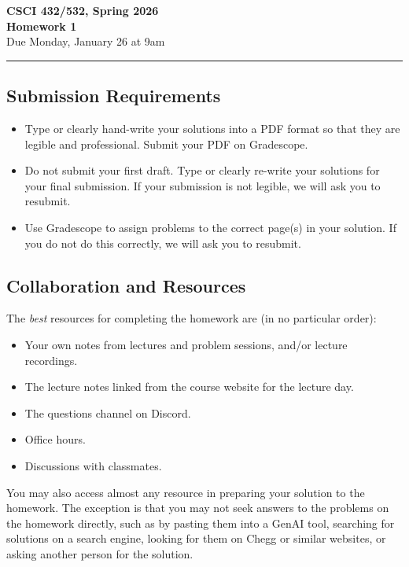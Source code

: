 \documentclass[11pt]{article}
\begin{document}
\begin{center}
\Large\textbf{CSCI 432/532, Spring 2026}%
\\
\LARGE\textbf{Homework 1}%
\\[0.5ex]
\large Due Monday, January 26 at 9am
\end{center}

\bigskip
\hrule
\bigskip

\subsection*{Submission Requirements}
\begin{itemize}
    \item Type or clearly hand-write your solutions into a PDF format so that they are legible and professional. Submit your PDF on Gradescope. 
    \item Do not submit your first draft. Type or clearly re-write your solutions for your final submission. If your submission is not legible, we will ask you to resubmit.
    \item Use Gradescope to assign problems to the correct page(s) in your solution. If you do not do this correctly, we will ask you to resubmit.
\end{itemize}

\subsection*{Collaboration and Resources}

The \emph{best} resources for completing the homework are (in no particular order):
\begin{itemize}
	\item Your own notes from lectures and problem sessions, and/or lecture recordings.
	\item The lecture notes linked from the course website for the lecture day.
	\item The questions channel on Discord.
	\item Office hours.
	\item Discussions with classmates.
\end{itemize}
You may also access almost any resource in preparing your solution to the
homework. The exception is that you may not seek answers to the problems on the
homework directly, such as by pasting them into a GenAI tool, searching for
solutions on a search engine, looking for them on Chegg or similar websites, or
asking another person for the solution.
\end{document}
